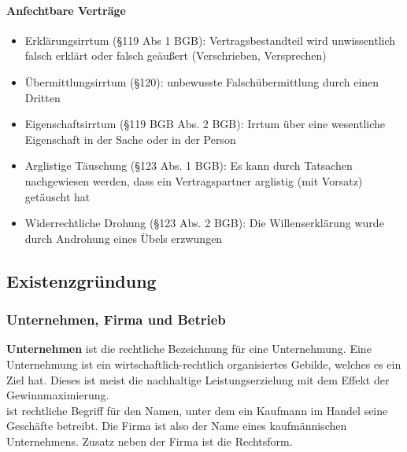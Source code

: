 \paragraph{Anfechtbare Verträge}

\begin{itemize}
\setlength\itemsep{0em}
	\item Erklärungsirrtum (§119 Abs 1 BGB): Vertragsbestandteil wird unwissentlich falsch erklärt oder falsch geäußert (Verschrieben, Versprechen)
	\item Übermittlungsirrtum (§120): unbewusste Falschübermittlung durch einen Dritten
	\item Eigenschaftsirrtum (§119 BGB Abs. 2 BGB): Irrtum über eine wesentliche Eigenschaft in der Sache oder in der Person
	\item Arglistige Täuschung (§123 Abs. 1 BGB): Es kann durch Tatsachen nachgewiesen werden, dass ein Vertragspartner arglistig (mit Vorsatz) getäuscht hat
	\item Widerrechtliche Drohung (§123 Abs. 2 BGB): Die Willenserklärung wurde durch Androhung eines Übels erzwungen
\end{itemize}


\subsection{Existenzgründung}

\subsubsection{Unternehmen, Firma und Betrieb}

{\bf Unternehmen} ist die rechtliche Bezeichnung für eine Unternehmung. Eine 	Unternehmung ist ein wirtschaftlich-rechtlich organisiertes Gebilde, welches es ein Ziel hat. Dieses ist meist die nachhaltige Leistungserzielung mit dem Effekt der Gewinnmaximierung.\\

 ist rechtliche Begriff für den Namen, unter dem ein Kaufmann im Handel seine Geschäfte betreibt. Die Firma ist also der Name eines kaufmännischen Unternehmens. Zusatz neben der Firma ist die Rechtsform.\\


